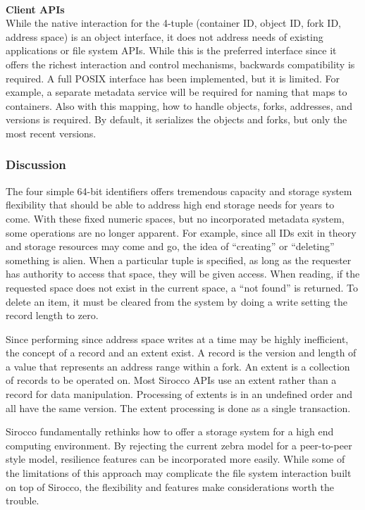 ~\\\noindent\textbf{Client APIs}\\
While the native interaction for the 4-tuple (container ID, object ID, fork ID,
address space) is an object interface, it does not address needs of existing
applications or file system APIs. While this is the preferred interface since
it offers the richest interaction and control mechanisms, backwards
compatibility is required. A full POSIX interface has been implemented, but it
is limited. For example, a separate metadata service will be required for
naming that maps to containers. Also with this mapping, how to handle objects,
forks, addresses, and versions is required. By default, it serializes the
objects and forks, but only the most recent versions.

\subsubsection{Discussion}
The four simple 64-bit identifiers offers tremendous capacity and storage
system flexibility that should be able to address high end storage needs for
years to come. With these fixed numeric spaces, but no incorporated metadata
system, some operations are no longer apparent. For example, since all IDs exit
in theory and storage resources may come and go, the idea of ``creating'' or
``deleting'' something is alien. When a particular tuple is specified, as long
as the requester has authority to access that space, they will be given access.
When reading, if the requested space does not exist in the current space, a
``not found'' is returned. To delete an item, it must be cleared from the
system by doing a write setting the record length to zero.

Since performing since address space writes at a time may be highly
inefficient, the concept of a record and an extent exist. A record is the
version and length of a value that represents an address range within a fork.
An extent is a collection of records to be operated on. Most Sirocco APIs use
an extent rather than a record for data manipulation. Processing of extents is
in an undefined order and all have the same version. The extent processing is
done as a single transaction.

Sirocco fundamentally rethinks how to offer a storage system for a high end
computing environment. By rejecting the current zebra model for a peer-to-peer
style model, resilience features can be incorporated more easily. While some of
the limitations of this approach may complicate the file system interaction
built on top of Sirocco, the flexibility and features make considerations worth
the trouble.

